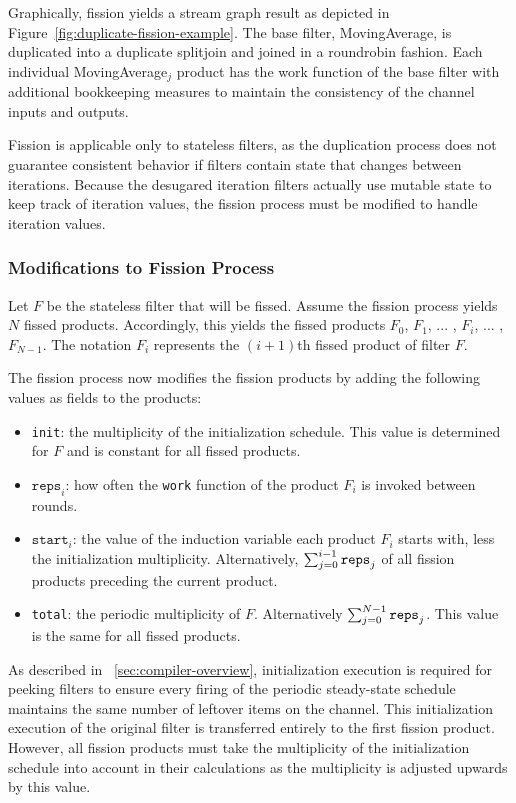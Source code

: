 Graphically, fission yields a stream graph result as depicted in Figure~\ref{fig:duplicate-fission-example}.  The base filter, MovingAverage, is duplicated into a duplicate splitjoin and joined in a roundrobin fashion.  Each individual MovingAverage$_j$ product has the work function of the base filter with additional bookkeeping measures to maintain the consistency of the channel inputs and outputs.

Fission is applicable only to stateless filters, as the duplication process does not guarantee consistent behavior if filters contain state that changes between iterations.  Because the desugared iteration filters actually use mutable state to keep track of iteration values, the fission process must be modified to handle iteration values.  

\subsubsection{Modifications to Fission Process}

Let $F$ be the stateless filter that will be fissed.  Assume the fission process yields $N$ fissed products.  Accordingly, this yields the fissed products $F_0$, $F_1$, ... , $F_i$, ... , $F_{N-1}$.  The notation $F_{i}$ represents the $(i+1)$th fissed product of filter $F$.

The fission process now modifies the fission products by adding the
following values as fields to the products:
\begin{itemize}
    \item \texttt{init}: the multiplicity of the initialization schedule.  This value is determined for $F$ and is constant for all fissed products.
    \item $\texttt{reps}_i$: how often the \texttt{work} function of the product $F_i$ is
      invoked between rounds.
    \item $\texttt{start}_i$: the value of the induction variable each product $F_i$ starts with, less the initialization multiplicity.  Alternatively, $\sum_{j=0}^{i-1}{\tt reps}_j$ of all fission products preceding the current product.
    \item \texttt{total}: the periodic multiplicity of $F$.  Alternatively $\sum_{j=0}^{N-1}{\tt reps}_j$. This value is the same for all fissed products.
\end{itemize}
As described in ~\ref{sec:compiler-overview}, initialization execution is required for peeking filters to ensure every firing of the periodic steady-state schedule maintains the same number of leftover items on the channel.  This initialization execution of the original filter is transferred entirely to the first fission product.  However, all fission products must take the multiplicity of the initialization schedule into account in their calculations as the multiplicity is adjusted upwards by this value.

